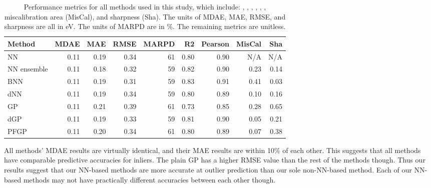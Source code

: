 \documentclass[]{achemso}
\begin{document}
\begin{table}
    \centering
    \begin{tabular}{lrrrrrrrr}
        \toprule
        Method              & \gls{MDAE}    & \gls{MAE} & \gls{RMSE}    & \gls{MARPD}   & \gls{R2}  & \gls{Pearson} & MisCal    & Sha \\
        \midrule
        \gls{NN}            & 0.11          & 0.19      & 0.34          & 61            & 0.80      & 0.90          & N/A       & N/A \\
        \gls{NN} ensemble   & 0.11          & 0.18      & 0.32          & 59            & 0.82      & 0.90          & 0.23      & 0.14 \\
        \gls{BNN}           & 0.11          & 0.19      & 0.31          & 59            & 0.83      & 0.91          & 0.41      & 0.03 \\
        \gls{dNN}           & 0.11          & 0.19      & 0.34          & 59            & 0.80      & 0.89          & 0.10      & 0.16 \\
        \gls{GP}            & 0.11          & 0.21      & 0.39          & 61            & 0.73      & 0.85          & 0.28      & 0.65 \\
        \gls{dGP}           & 0.11          & 0.19      & 0.33          & 59            & 0.81      & 0.90          & 0.05      & 0.21 \\
        \gls{PFGP}          & 0.11          & 0.20      & 0.34          & 61            & 0.80      & 0.89          & 0.07      & 0.38 \\
        \bottomrule
    \end{tabular}
    \caption{Performance metrics for all methods used in this study, which include:
    , , , ,
    , ,
    miscalibration area (MisCal), and sharpness (Sha).
    The units of \gls{MDAE}, \gls{MAE}, \gls{RMSE}, and sharpness are all in \gls{eV}.
    The units of \gls{MARPD} are in \%.
    The remaining metrics are unitless.}\label{tab:results}
\end{table}

All methods' \gls{MDAE} results are virtually identical, and their \gls{MAE} results are within 10\% of each other.
This suggests that all methods have comparable predictive accuracies for inliers.
The plain \gls{GP} has a higher \gls{RMSE} value than the rest of the methods though.
Thus our results suggest that our \gls{NN}-based methods are more accurate at outlier prediction than our sole non-\gls{NN}-based method.
Each of our \gls{NN}-based methods may not have practically different accuracies between each other though.
\end{document}
